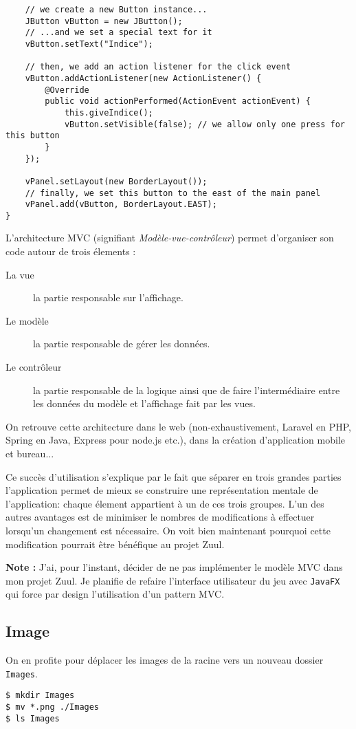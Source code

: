 \begin{exercise}[subtitle=getCommandList]
\begin{verbatim}
    // we create a new Button instance...
    JButton vButton = new JButton();
    // ...and we set a special text for it
    vButton.setText("Indice");
    
    // then, we add an action listener for the click event
    vButton.addActionListener(new ActionListener() {
        @Override
        public void actionPerformed(ActionEvent actionEvent) {
            this.giveIndice();
            vButton.setVisible(false); // we allow only one press for this button
        }
    });

    vPanel.setLayout(new BorderLayout());
    // finally, we set this button to the east of the main panel
    vPanel.add(vButton, BorderLayout.EAST);
}
\end{verbatim}
\end{exercise}

\begin{exercise}[subtitle="MVC"]

L'architecture MVC (signifiant \emph{Modèle-vue-contrôleur}) permet d'organiser son code autour de trois élements :

\begin{description} 
  \item[La vue] la partie responsable sur l'affichage.
  \item[Le modèle] la partie responsable de gérer les données.
  \item[Le contrôleur] la partie responsable de la logique ainsi que de faire l'intermédiaire entre les données du modèle et l'affichage fait par les vues.
\end{description}

On retrouve cette architecture dans le web (non-exhaustivement, Laravel en PHP, Spring en Java, Express pour node.js etc.), dans la création d'application mobile et bureau...

Ce succès d'utilisation s'explique par le fait que séparer en trois grandes parties l'application permet de mieux se construire une représentation mentale de l'application: chaque élement appartient à un de ces trois groupes. L'un des autres avantages est de minimiser le nombres de modifications à effectuer lorsqu'un changement est nécessaire. On voit bien maintenant pourquoi cette modification pourrait être bénéfique au projet Zuul.

\textbf{Note :} J'ai, pour l'instant, décider de ne pas implémenter le modèle MVC dans mon projet Zuul. Je planifie de refaire l'interface utilisateur du jeu avec \verb|JavaFX| qui force par design l'utilisation d'un pattern MVC.

\subsection*{Image}

On en profite pour déplacer les images de la racine vers un nouveau dossier \verb|Images|.

\begin{verbatim}
$ mkdir Images
$ mv *.png ./Images
$ ls Images
\end{verbatim}
\end{exercise}


